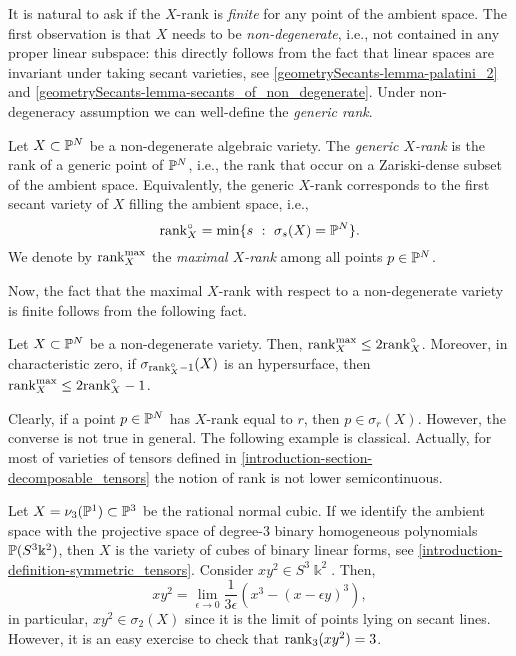  It is natural to ask if the $X$-rank is \emph{finite} for any point of the ambient space. The first observation is that $X$ needs to be \emph{non-degenerate}, i.e., not contained in any proper linear subspace: this directly follows from the fact that linear spaces are invariant under taking secant varieties, see \ref{geometrySecants-lemma-palatini_2} and \ref{geometrySecants-lemma-secants_of_non_degenerate}. Under non-degeneracy assumption we can well-define the \emph{generic rank}.
 
 \begin{definition}
     \label{geometrySecants-definition-generic_rank}
     Let $X \subset \mathbb{P}^N$ be a non-degenerate algebraic variety. The \emph{generic $X$-rank} is the rank of a generic point of $\mathbb{P}^N$, i.e., the rank that occur on a Zariski-dense subset of the ambient space. Equivalently, the generic $X$-rank corresponds to the first secant variety of $X$ filling the ambient space, i.e., 
     \[
         \mathrm{rank}_X^\circ = \min\{s ~:~ \sigma_s(X) = \mathbb{P}^N\}.
     \]
     We denote by $\mathrm{rank}_X^{\max}$ the \emph{maximal $X$-rank} among all points $p \in \mathbb{P}^N$. 
 \end{definition}
 Now, the fact that the maximal $X$-rank with respect to a non-degenerate variety is finite follows from the following fact. 
 
 \begin{theorem}[\cite{BT15}]
     Let $X \subset \mathbb{P}^N$ be a non-degenerate variety. Then, $\mathrm{rank}_X^{\max} \leq 2\mathrm{rank}_X^\circ$. Moreover, in characteristic zero, if $\sigma_{\mathrm{rank}^\circ_X-1}(X)$ is an hypersurface, then $\mathrm{rank}_X^{\max} \leq 2\mathrm{rank}_X^\circ-1$.
 \end{theorem}
 
 Clearly, if a point $p \in \mathbb{P}^N$ has $X$-rank equal to $r$, then $p \in \sigma_r(X)$. However, the converse is not true in general. The following example is classical. Actually, for most of varieties of tensors defined in \ref{introduction-section-decomposable_tensors} the notion of rank is not lower semicontinuous.
 
 \begin{example}
 \label{geometrySecants-example-Xrank_semicontinuous}
   Let $X = \nu_3(\mathbb{P}^1) \subset \mathbb{P}^3$ be the rational normal cubic. If we identify the ambient space with the projective space of degree-$3$ binary homogeneous polynomials $\mathbb{P}(S^3\Bbbk^2)$, then $X$ is the variety of cubes of binary linear forms, see \ref{introduction-definition-symmetric_tensors}. Consider $xy^2 \in S^3\Bbbk^2$. Then, 
   \[
      xy^2 = \lim_{\epsilon \to 0} \frac{1}{3\epsilon}\left( x^3 - (x-\epsilon y)^3\right),
 \]
  in particular, $xy^2 \in \sigma_2(X)$ since it is the limit of points lying on secant lines. However, it is an easy exercise to check that $\mathrm{rank}_3(xy^2) = 3$. 
 \end{example}
 
